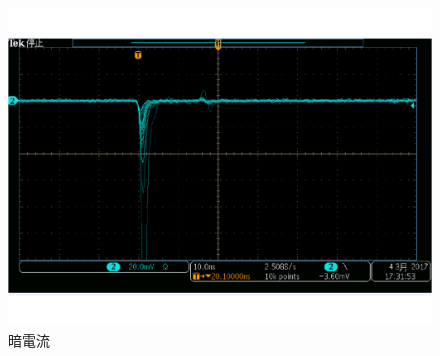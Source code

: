 \begin{figure}[htbp]
\centering
\includegraphics[keepaspectratio,scale=0.3]{fig/ybm/oscillo2.pdf}

\caption{暗電流}
\label{fig:oscillo2}
\end{figure}

